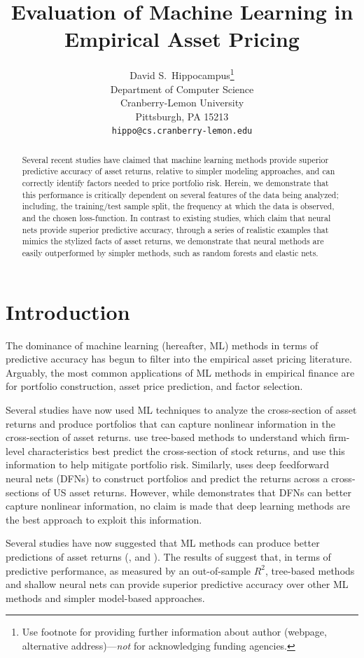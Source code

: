 \documentclass{article}
\title{Evaluation of Machine Learning in Empirical Asset Pricing}
\author{%
  David S.~Hippocampus\thanks{Use footnote for providing further information
    about author (webpage, alternative address)---\emph{not} for acknowledging
    funding agencies.} \\
  Department of Computer Science\\
  Cranberry-Lemon University\\
  Pittsburgh, PA 15213 \\
  \texttt{hippo@cs.cranberry-lemon.edu} \\
}
\begin{document}
\maketitle

\begin{abstract}
	Several recent studies have claimed that machine learning methods provide superior predictive accuracy of asset returns, relative to simpler modeling approaches, and can correctly identify factors needed to price portfolio risk. Herein, we demonstrate that this performance is critically dependent on several features of the data being analyzed; including, the training/test sample split, the frequency at which the data is observed, and the chosen loss-function. In contrast to existing studies, which claim that neural nets provide superior predictive accuracy, through a series of realistic examples that mimics the stylized facts of asset returns, we demonstrate that neural methods are easily outperformed by simpler methods, such as random forests and elastic nets.
\end{abstract}

\section{Introduction}
The dominance of machine learning (hereafter, ML) methods in terms of predictive accuracy has begun to filter into the empirical asset pricing literature. Arguably, the most common applications of ML methods in empirical finance are for portfolio construction, asset price prediction, and factor selection. 

Several studies have now used ML techniques to analyze the cross-section of asset returns and produce portfolios that can capture nonlinear information in the cross-section of asset returns. \cite{moritz_tree-based_2016} use tree-based methods to understand which firm-level characteristics best predict the cross-section of stock returns, and use this information to help mitigate portfolio risk. Similarly, \cite{messmer_deep_2017} uses deep feedforward neural nets (DFNs) to construct portfolios and predict the returns across a cross-sections of US asset returns. However, while \cite{messmer_deep_2017} demonstrates that DFNs can better capture nonlinear information, no claim is made that deep learning methods are the best approach to exploit this information. 

Several studies have now suggested that ML methods can produce better predictions of asset returns (\cite{gu_empirical_2019}, \cite{hsu_finding_2014} and \cite{feng_deep_2018}). The results of \cite{gu_empirical_2019} suggest that, in terms of predictive performance, as measured by an out-of-sample $R^2$,  tree-based methods and shallow neural nets can provide superior predictive accuracy over other ML methods and simpler model-based approaches. %
\end{document}
